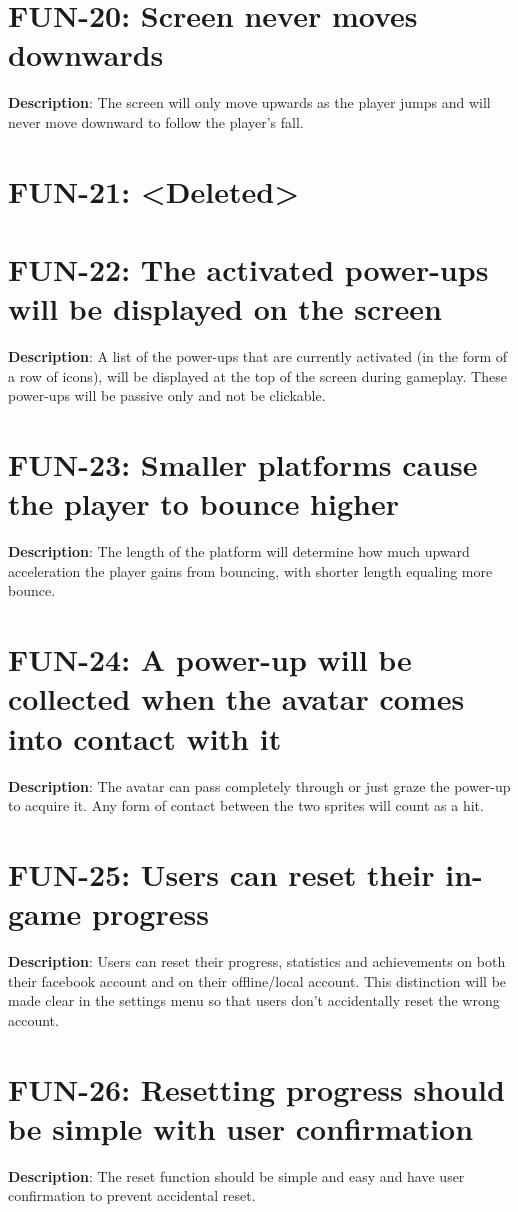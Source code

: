 \section{FUN-20: Screen never moves downwards}
\textbf{Description}: The screen will only move upwards as the player
jumps and will never move downward to follow the player\textquoteright{}s
fall.
\section{FUN-21: <Deleted>}
\section{FUN-22: The activated power-ups will be displayed on the screen}
\textbf{Description}: A list of the power-ups that are currently activated
(in the form of a row of icons), will be displayed at the top of the
screen during gameplay. These power-ups will be passive only and not
be clickable.
\section{FUN-23: Smaller platforms cause the player to bounce higher}
\textbf{Description}: The length of the platform will determine how
much upward acceleration the player gains from bouncing, with shorter
length equaling more bounce.
\section{FUN-24: A power-up will be collected when the avatar comes into contact
with it}
\textbf{Description}: The avatar can pass completely through or just
graze the power-up to acquire it. Any form of contact between the
two sprites will count as a hit.
\section{FUN-25: Users can reset their in-game progress}
\textbf{Description}: Users can reset their progress, statistics and
achievements on both their facebook account and on their offline/local
account. This distinction will be made clear in the settings menu
so that users don\textquoteright{}t accidentally reset the wrong account.
\section{FUN-26: Resetting progress should be simple with user confirmation}
\textbf{Description}: The reset function should be simple and easy
and have user confirmation to prevent accidental reset.
